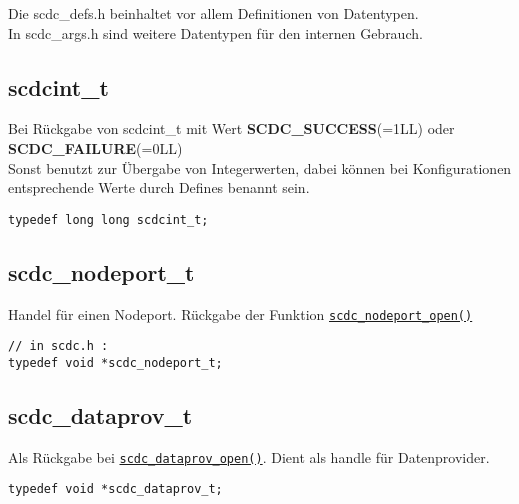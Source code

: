 Die scdc\_defs.h beinhaltet vor allem Definitionen von Datentypen.\\
In scdc\_args.h sind weitere Datentypen für den internen Gebrauch.

\subsection{scdcint\_t}\label{scdcint_t}
Bei Rückgabe von scdcint\_t mit Wert \textbf{SCDC\_SUCCESS}(=1LL) oder \textbf{SCDC\_FAILURE}(=0LL)\\
Sonst benutzt zur Übergabe von Integerwerten, dabei können bei Konfigurationen entsprechende Werte durch Defines benannt sein.
\begin{lstlisting}[label={l:scdcint_t}]
typedef long long scdcint_t;
\end{lstlisting}


\subsection{scdc\_nodeport\_t}\label{scdc_nodeport_t}
Handel für einen Nodeport. Rückgabe der Funktion \hyperref[scdc_nodeport_open]{\texttt{scdc\_nodeport\_open()}}
\begin{lstlisting}[label={l:scdc_nodeport_t}]
// in scdc.h :
typedef void *scdc_nodeport_t;
\end{lstlisting}


\subsection{scdc\_dataprov\_t}\label{scdc_dataprov_t}
Als Rückgabe bei \hyperref[scdc_dataprov_open]{\texttt{scdc\_dataprov\_open()}}. Dient als handle für Datenprovider.\\
\begin{lstlisting}[label={l:scdc_dataprov_t}]
typedef void *scdc_dataprov_t;
\end{lstlisting}


\pagebreak
